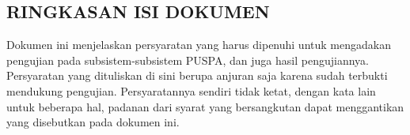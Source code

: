 \subsection*{\textcolor{subsectioncolor}{\textsf{RINGKASAN ISI DOKUMEN}}}

Dokumen ini menjelaskan persyaratan yang harus dipenuhi untuk mengadakan pengujian pada subsistem-subsistem PUSPA, dan juga hasil pengujiannya.
Persyaratan yang dituliskan di sini berupa anjuran saja karena sudah terbukti mendukung pengujian.
Persyaratannya sendiri tidak ketat, dengan kata lain untuk beberapa hal, padanan dari syarat yang bersangkutan dapat menggantikan yang disebutkan pada dokumen ini.
